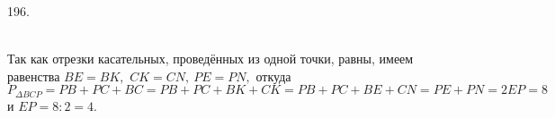 196. \begin{figure}[ht!]
\end{figure}\\
Так как отрезки касательных, проведённых из одной точки, равны, имеем равенства $BE=BK,$ $CK=CN,\ PE=PN,$ откуда $P_{\Delta BCP}=PB+PC+BC=PB+PC+BK+CK=
PB+PC+BE+CN=PE+PN=2EP=8$ и $EP=8:2=4.$\\
